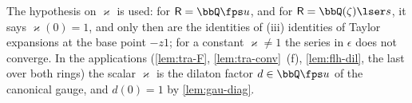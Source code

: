 The hypothesis on $\varkappa$ is used: for $\mathsf R=\bbQ\fps u$, and for $\mathsf R=\bbQ(\zeta)\lser s$, it says $\varkappa(0)=1$, and only then are the identities of (iii) identities of Taylor expansions at the base point $-z1$; for a constant $\varkappa\neq1$ the series in $\epsilon$ does not converge. In the applications (\cref{lem:tra-F}, \cref{lem:tra-conv}~(f), \cref{lem:flh-dil}, the last over both rings) the scalar $\varkappa$ is the dilaton factor $d\in\bbQ\fps u$ of the canonical gauge, and $d(0)=1$ by \cref{lem:gau-diag}.


